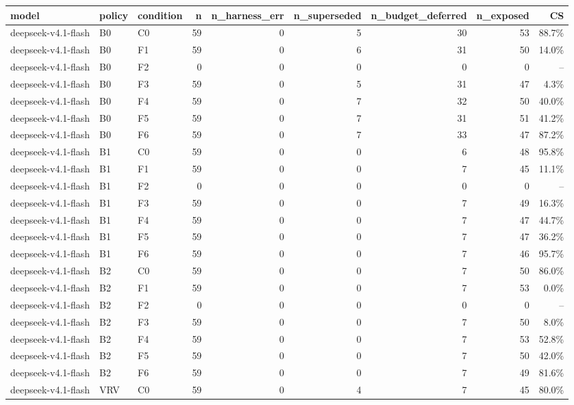 \begin{tabular}{lllrrrrrr}
\toprule
model & policy & condition & n & n\_harness\_err & n\_superseded & n\_budget\_deferred & n\_exposed & CS \\
\midrule
deepseek-v4.1-flash & B0 & C0 & 59 & 0 & 5 & 30 & 53 & 88.7\% \\
deepseek-v4.1-flash & B0 & F1 & 59 & 0 & 6 & 31 & 50 & 14.0\% \\
deepseek-v4.1-flash & B0 & F2 & 0 & 0 & 0 & 0 & 0 & -- \\
deepseek-v4.1-flash & B0 & F3 & 59 & 0 & 5 & 31 & 47 & 4.3\% \\
deepseek-v4.1-flash & B0 & F4 & 59 & 0 & 7 & 32 & 50 & 40.0\% \\
deepseek-v4.1-flash & B0 & F5 & 59 & 0 & 7 & 31 & 51 & 41.2\% \\
deepseek-v4.1-flash & B0 & F6 & 59 & 0 & 7 & 33 & 47 & 87.2\% \\
deepseek-v4.1-flash & B1 & C0 & 59 & 0 & 0 & 6 & 48 & 95.8\% \\
deepseek-v4.1-flash & B1 & F1 & 59 & 0 & 0 & 7 & 45 & 11.1\% \\
deepseek-v4.1-flash & B1 & F2 & 0 & 0 & 0 & 0 & 0 & -- \\
deepseek-v4.1-flash & B1 & F3 & 59 & 0 & 0 & 7 & 49 & 16.3\% \\
deepseek-v4.1-flash & B1 & F4 & 59 & 0 & 0 & 7 & 47 & 44.7\% \\
deepseek-v4.1-flash & B1 & F5 & 59 & 0 & 0 & 7 & 47 & 36.2\% \\
deepseek-v4.1-flash & B1 & F6 & 59 & 0 & 0 & 7 & 46 & 95.7\% \\
deepseek-v4.1-flash & B2 & C0 & 59 & 0 & 0 & 7 & 50 & 86.0\% \\
deepseek-v4.1-flash & B2 & F1 & 59 & 0 & 0 & 7 & 53 & 0.0\% \\
deepseek-v4.1-flash & B2 & F2 & 0 & 0 & 0 & 0 & 0 & -- \\
deepseek-v4.1-flash & B2 & F3 & 59 & 0 & 0 & 7 & 50 & 8.0\% \\
deepseek-v4.1-flash & B2 & F4 & 59 & 0 & 0 & 7 & 53 & 52.8\% \\
deepseek-v4.1-flash & B2 & F5 & 59 & 0 & 0 & 7 & 50 & 42.0\% \\
deepseek-v4.1-flash & B2 & F6 & 59 & 0 & 0 & 7 & 49 & 81.6\% \\
deepseek-v4.1-flash & VRV & C0 & 59 & 0 & 4 & 7 & 45 & 80.0\% \\

\end{tabular}
